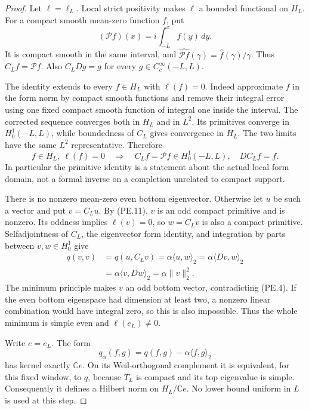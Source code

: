\begin{proof}
Let \(\ell=\ell_L\).  Local strict positivity makes \(\ell\)
a bounded functional on \(H_L\).
For a compact smooth mean-zero function \(f\), put
\[
       (\mathcal P f)(x)=i\int_{-L}^x f(y)\,dy .
 \tag{PE.10}
\]
It is compact smooth in the same interval, and
\(\widehat{\mathcal P f}(\gamma)=\widehat f(\gamma)/\gamma\).
Thus \(C_Lf=\mathcal P f\).  Also
\(C_LDg=g\) for every \(g\in C_c^\infty(-L,L)\).

The identity extends to every \(f\in H_L\) with \(\ell(f)=0\).
Indeed approximate \(f\) in the form norm by compact smooth
functions and remove their integral error using one fixed compact
smooth function of integral one inside the interval.
The corrected sequence converges both in \(H_L\) and in \(L^2\).
Its primitives converge in \(H^1_0(-L,L)\), while boundedness of
\(C_L\) gives convergence in \(H_L\).  The two limits have the same
\(L^2\) representative.  Therefore
\[
 f\in H_L,\ \ell(f)=0
 \quad\Longrightarrow\quad
 C_Lf=\mathcal P f\in H^1_0(-L,L),\quad DC_Lf=f .
 \tag{PE.11}
\]
In particular the primitive identity is a statement about the
actual local form domain, not a formal inverse on a completion
unrelated to compact support.

There is no nonzero mean-zero even bottom eigenvector.
Otherwise let \(u\) be such a vector and put \(v=C_Lu\).
By (PE.11), \(v\) is an odd compact primitive and is nonzero.
Its oddness implies \(\ell(v)=0\), so \(w=C_Lv\) is also a compact
primitive.  Selfadjointness of \(C_L\), the eigenvector form
identity, and integration by parts between \(v,w\in H^1_0\)
give
\[
 \begin{aligned}
 q(v,v)&=q(u,C_Lv)
      =\alpha\langle u,w\rangle_2
      =\alpha\langle Dv,w\rangle_2\\
      &=\alpha\langle v,Dw\rangle_2
       =\alpha\|v\|_2^2 .
 \end{aligned}
 \tag{PE.12}
\]
The minimum principle makes \(v\) an odd bottom vector,
contradicting (PE.4).
If the even bottom eigenspace had dimension at least two, a
nonzero linear combination would have integral zero, so this is
also impossible.  Thus the whole minimum is simple even and
\(\ell(e_L)\ne0\).

Write \(e=e_L\).  The form
\[
             q_\alpha(f,g)=q(f,g)-\alpha\langle f,g\rangle_2
 \tag{PE.13}
\]
has kernel exactly \(\mathbb C e\).  On its Weil-orthogonal
complement it is equivalent, for this fixed window, to \(q\),
because \(T_L\) is compact and its top eigenvalue is simple.
Consequently it defines a Hilbert norm on \(H_L/\mathbb C e\).
No lower bound uniform in \(L\) is used at this step.


\end{proof}
